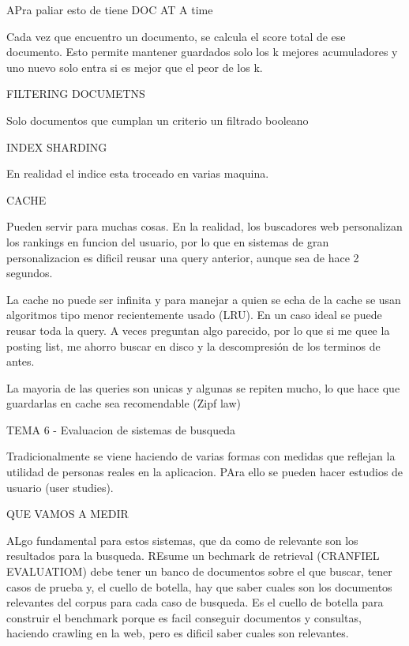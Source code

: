 APra paliar esto de tiene DOC AT A time

Cada vez que encuentro un documento, se calcula el score total de ese documento. Esto permite mantener guardados solo los k mejores acumuladores y uno nuevo solo entra si es mejor que el peor de los k.



FILTERING DOCUMETNS 

Solo documentos que cumplan un criterio un filtrado booleano


INDEX SHARDING 

En realidad el indice esta troceado en varias maquina.


CACHE

Pueden servir para muchas cosas. En la realidad, los buscadores web personalizan los rankings en funcion del usuario, por lo que en sistemas de gran personalizacion es dificil reusar una query anterior, aunque sea de hace 2 segundos. 

La cache no puede ser infinita y para manejar a quien se echa de la cache se usan algoritmos tipo menor recientemente usado (LRU). En un caso ideal se puede reusar toda la query. A veces preguntan algo parecido, por lo que si me quee la posting list, me ahorro buscar en disco y la descompresión de los terminos de antes. 

La mayoria de las queries son unicas y algunas se repiten mucho, lo que hace que guardarlas en cache sea recomendable (Zipf law)








TEMA 6 - Evaluacion de sistemas de busqueda

Tradicionalmente se viene haciendo de varias formas con medidas que reflejan la utilidad de personas reales  en la aplicacion. PAra ello se pueden hacer estudios de usuario (user studies). 


QUE VAMOS A MEDIR 

ALgo fundamental para estos sistemas, que da como de relevante son los resultados para la busqueda. REsume un bechmark de retrieval (CRANFIEL EVALUATIOM) debe tener un banco de documentos sobre el que buscar, tener casos de prueba y, el cuello de botella, hay que saber cuales son los documentos relevantes del corpus para cada caso de busqueda. Es el cuello de botella para construir el benchmark porque es facil conseguir documentos y consultas, haciendo crawling en la web, pero es dificil saber cuales son relevantes.

